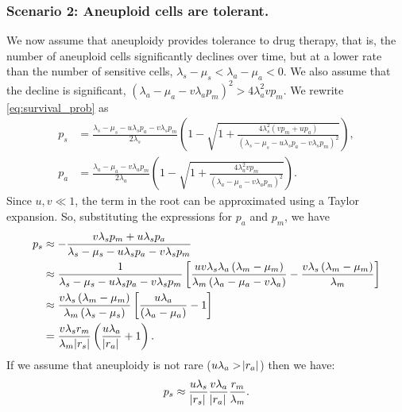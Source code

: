 \documentclass[12pt]{extarticle}
\renewcommand{\Delta}{r}
\begin{document}
\begin{appendices}
\subsubsection*{Scenario 2: Aneuploid cells are tolerant.} 

We now assume that aneuploidy provides tolerance to drug therapy, that is, the number of aneuploid cells significantly declines over time, but at a lower rate than the number of sensitive cells, $\lambda_s - \mu_s < \lambda_a - \mu_a < 0$. We also assume that the decline is significant, $\left(\lambda_a-\mu_a-v\lambda_ap_m\right)^2 > 4\lambda_a^2 v p_m$. %
We rewrite \cref{eq:survival_prob} as
\begin{equation}
\begin{aligned}
p_s&=\frac{\lambda_s-\mu_s-u\lambda_sp_a-v\lambda_sp_m}{2\lambda_s}\left(1-\sqrt{1+\frac{4\lambda_s^2\left(vp_m+up_a\right)}{\left(\lambda_s-\mu_s-u\lambda_sp_a-v\lambda_sp_m\right)^2}}\right), \\
p_a&=\frac{\lambda_a-\mu_a-v\lambda_ap_m}{2\lambda_a}\left(1-\sqrt{1+\frac{4\lambda_a^2vp_m}{\left(\lambda_a-\mu_a-v\lambda_ap_m\right)^2}}\right) .
\end{aligned}
\end{equation}
Since $u,v\ll1$, the term in the root can be approximated using a Taylor expansion. So, substituting the expressions for $p_a$ and $p_m$, we have
\begin{equation} \label{eq:survprobwinitial}
\begin{aligned}
p_s&\approx-\frac{v\lambda_sp_m+u\lambda_sp_a}{\lambda_s-\mu_s-u\lambda_sp_a-v\lambda_sp_m}\\
&\approx\frac{1}{\lambda_s-\mu_s-u\lambda_sp_a-v\lambda_sp_m}\left[\frac{uv\lambda_s\lambda_a\left(\lambda_m-\mu_m\right)}{\lambda_m\left(\lambda_a-\mu_a-v\lambda_a\right)}-\frac{v\lambda_s\left(\lambda_m-\mu_m\right)}{\lambda_m}\right]\\ 
&\approx\frac{v\lambda_s\left(\lambda_m-\mu_m\right)}{\lambda_m\left(\lambda_s-\mu_s\right)}\left[\frac{u\lambda_a}{\left(\lambda_a-\mu_a\right)}-1\right] \\
&=\frac{v\lambda_s\Delta_m}{\lambda_m \abs{\Delta_s}}\left(\frac{u\lambda_a}{\abs{\Delta_a}}+1\right) .
\end{aligned}
\end{equation}
If we assume that aneuploidy is not rare ($u\lambda_a>\abs{\Delta_a}$) then we have:
\begin{equation}\label{eq:pw_tolerant}
p_s\approx\frac{u\lambda_s}{\abs{\Delta_s}} \frac{v\lambda_a}{\abs{\Delta_a}} \frac{\Delta_m}{\lambda_m}.
\end{equation}


\end{appendices}
\end{document}
